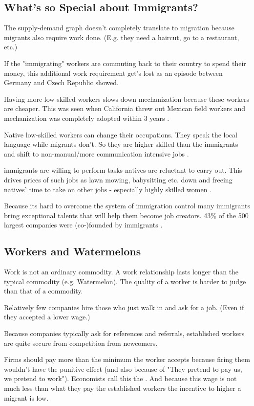 \documentclass[a4paper, twocolumn]{article}
\newcommand{\keyword}[1]{\textbf{\color{black}{#1}}}
\begin{document}
\subsection{What's so Special about Immigrants?}
The supply-demand graph doesn't completely translate to migration because migrants also require work done. (E.g. they need a haircut, go to a restaurant, etc.)

If the "immigrating" workers are commuting back to their country to spend their money, this additional work requirement get's lost as an episode between Germany and Czech Republic showed.

Having more low-skilled workers slows down mechanization because these workers are cheaper. This was seen when California threw out Mexican field workers and mechanization was completely adopted within 3 years \cite{mechanization}.

Native low-skilled workers can change their occupations. They speak the local language while migrants don't. So they are higher skilled than the immigrants and shift to non-manual/more communication intensive jobs \cite{native-low-skilled}.

immigrants are willing to perform tasks natives are reluctant to carry out. This drives prices of such jobs as lawn mowing, babysitting etc. down and freeing natives' time to take on other jobs \cite{low-skilled-wages} - especially highly skilled women \cite{high-skilled-women}.

Because its hard to overcome the system of immigration control many immigrants bring exceptional talents that will help them become job creators. 43\% of the 500 largest companies were (co-)founded by immigrants \cite{immigrant-founders}.

\subsection{Workers and Watermelons}
Work is not an ordinary commodity. A work relationship lasts longer than the typical commodity (e.g. Watermelon). The quality of a worker is harder to judge than that of a commodity.

Relatively few companies hire those who just walk in and ask for a job. (Even if they accepted a lower wage.)

Because companies typically ask for references and referrals, established workers are quite secure from competition from newcomers.

Firms should pay more than the minimum the worker accepts because firing them wouldn't have the punitive effect (and also because of "They pretend to pay us, we pretend to work"). Economists call this the \keyword{efficiency wage}. And because this wage is not much less than what they pay the established workers the incentive to higher a migrant is low.
\end{document}
